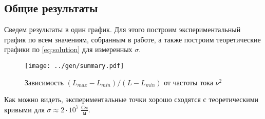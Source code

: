 \subsection*{Общие результаты}

Сведем результаты в один график. Для этого построим экспериментальный график по всем значениям, собранным в работе, а также построим теоретические графики по \ref{eq:solution} для измеренных $\sigma$.

\begin{figure}[H]
	\centering
	\texttt{[image: ../gen/summary.pdf]}
	\caption{Зависимость $(L_{max} - L_{min})/(L - L_{min})$ от частоты тока $\nu^2$}
	\label{fig:summary}
\end{figure}

Как можно видеть, экспериментальные точки хорошо сходятся с теоретическими кривыми для $\sigma \approx 2 \cdot 10^7  \; \frac{\text{См}}{\text{м}}$.